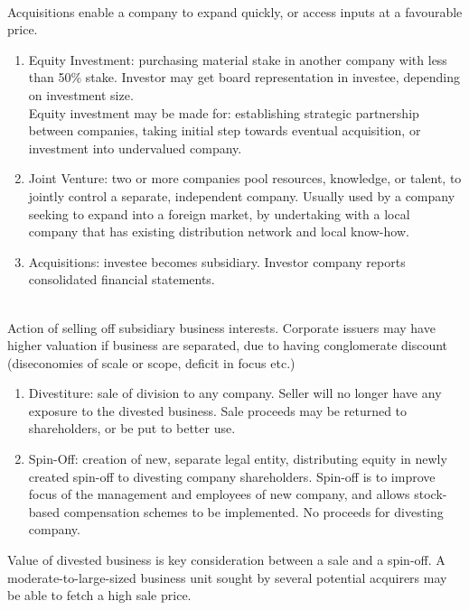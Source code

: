 \begin{remark} \\
Acquisitions enable a company to expand quickly, or access inputs at a favourable price.
\begin{enumerate}[label=\roman*.]
\setlength{\itemsep}{0pt}
\item Equity Investment: purchasing material stake in another company with less than 50\% stake. Investor may get board representation in investee, depending on investment size.\\
Equity investment may be made for: establishing strategic partnership between companies, taking initial step towards eventual acquisition, or investment into undervalued company.
\item Joint Venture: two or more companies pool resources, knowledge, or talent, to jointly control a separate, independent company. Usually used by a company seeking to expand into a foreign market, by undertaking with a local company that has existing distribution network and local know-how.
\item Acquisitions: investee becomes subsidiary. Investor company reports consolidated financial statements.
\end{enumerate}
\end{remark}

\begin{remark} \\
Action of selling off subsidiary business interests. Corporate issuers may have higher valuation if business are separated, due to having conglomerate discount (diseconomies of scale or scope, deficit in focus etc.)
\begin{enumerate}[label=\roman*.]
\setlength{\itemsep}{0pt}
\item Divestiture: sale of division to any company. Seller will no longer have any exposure to the divested business. Sale proceeds may be returned to shareholders, or be put to better use.
\item Spin-Off: creation of new, separate legal entity, distributing equity in newly created spin-off to divesting company shareholders. Spin-off is to improve focus of the management and employees of new company, and allows stock-based compensation schemes to be implemented. No proceeds for divesting company.
\end{enumerate}
Value of divested business is key consideration between a sale and a spin-off. A moderate-to-large-sized business unit sought by several potential acquirers may be able to fetch a high sale price.
\end{remark}

